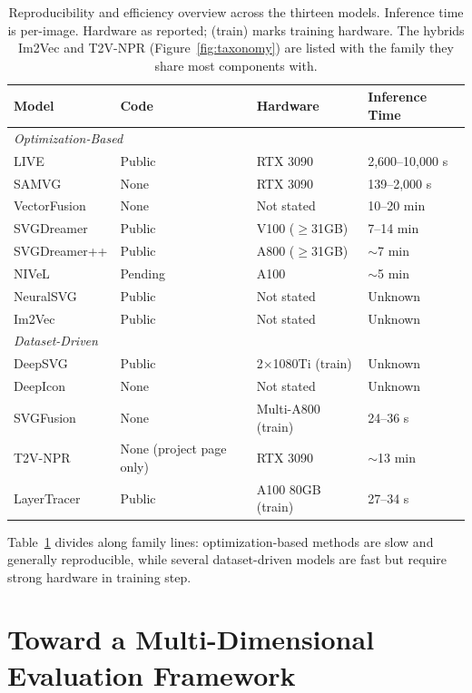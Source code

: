 \begin{table}[htbp]
\centering
\caption{Reproducibility and efficiency overview across 
the thirteen models. Inference time is per-image. 
Hardware as reported; (train) marks training hardware. The hybrids Im2Vec and T2V-NPR 
(Figure~\ref{fig:taxonomy}) are listed with the family 
they share most components with.}
\label{tab:reproducibility}
\small
\begin{tabularx}{\textwidth}{l l l l}
\toprule
\textbf{Model} & \textbf{Code} & \textbf{Hardware} & 
\textbf{Inference Time} \\
\midrule
\multicolumn{4}{l}{\textit{Optimization-Based}} \\
\midrule
LIVE         & Public   & RTX 3090        & 2,600--10,000 s \\
SAMVG        & None     & RTX 3090        & 139--2,000 s    \\
VectorFusion & None     & Not stated      & 10--20 min      \\
SVGDreamer   & Public   & V100 ($\geq$31GB)  & 7--14 min       \\
SVGDreamer++ & Public   & A800 ($\geq$31GB)  & $\sim$7 min     \\
NIVeL        & Pending  & A100            & $\sim$5 min     \\
NeuralSVG    & Public   & Not stated      & Unknown         \\
Im2Vec       & Public   & Not stated      & Unknown         \\
\midrule
\multicolumn{4}{l}{\textit{Dataset-Driven}} \\
\midrule
DeepSVG      & Public   & 2$\times$1080Ti (train) & Unknown  \\
DeepIcon     & None     & Not stated      & Unknown         \\
SVGFusion    & None     & Multi-A800 (train) & 24--36 s     \\
T2V-NPR      & None (project page only) & RTX 3090 & $\sim$13 min \\
LayerTracer  & Public   & A100 80GB (train) & 27--34 s      \\
\bottomrule
\end{tabularx}
\end{table}

Table~\ref{tab:reproducibility} divides 
along family lines: optimization-based methods 
are slow and generally reproducible, while several 
dataset-driven models are fast but require strong hardware in training step.


\section{Toward a Multi-Dimensional Evaluation Framework}
\label{sec:framework}

